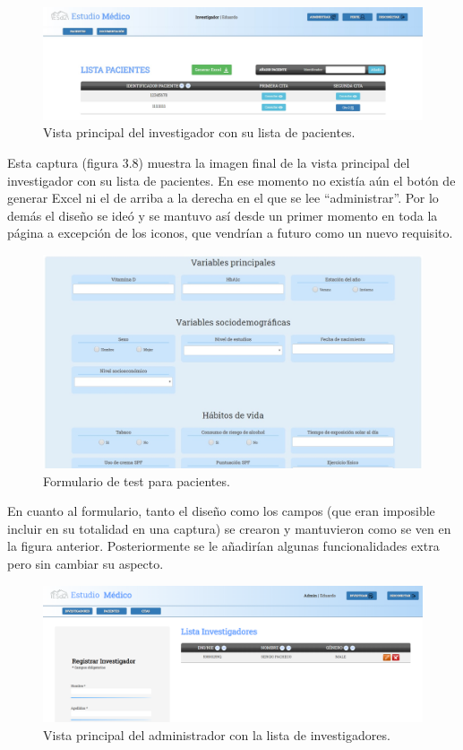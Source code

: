  \begin{figure}[h]
    \centering
     \includegraphics[width=1\textwidth]{images/investigadorPacientes.jpg}
    \caption{Vista principal del investigador con su lista de pacientes.}
\end{figure}

Esta captura (figura 3.8) muestra la imagen final de la vista principal del investigador con su lista de pacientes. En ese momento no existía aún el botón de generar Excel ni el de arriba a la derecha en el que se lee ``administrar''. Por lo demás el diseño se ideó y se mantuvo así desde un primer momento en toda la página a excepción de los iconos, que vendrían a futuro como un nuevo requisito.

\begin{figure}[h]
    \centering
     \includegraphics[width=1\textwidth]{images/testPacientes.jpg}
    \caption{Formulario de test para pacientes.}
\end{figure}

En cuanto al formulario, tanto el diseño como los campos (que eran imposible incluir en su totalidad en una captura) se crearon y mantuvieron como se ven en la figura anterior. Posteriormente se le añadirían algunas funcionalidades extra pero sin cambiar su aspecto.
\newpage

\begin{figure}[h]
    \centering
     \includegraphics[width=1\textwidth]{images/adminInvestigadores.png}
    \caption{Vista principal del administrador con la lista de investigadores.}
\end{figure}

